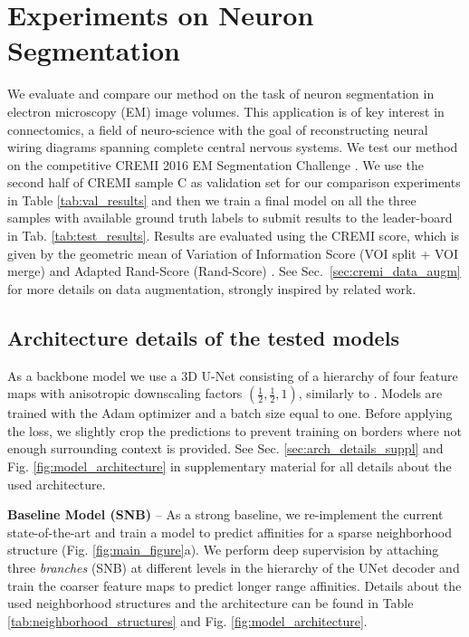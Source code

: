 

\section{Experiments on Neuron Segmentation}
We evaluate and compare our method on the task of neuron segmentation in electron microscopy (EM) image volumes. This application is of key interest in connectomics, a field of neuro-science with the goal of reconstructing neural wiring diagrams spanning complete central nervous systems. 
We test our method on the competitive CREMI 2016 EM Segmentation Challenge \cite{cremiChallenge}. 
We use the second half of CREMI sample C as validation set for our comparison experiments in Table \ref{tab:val_results} and then we train a final model on all the three samples with available ground truth labels to submit results to the leader-board in Tab. \ref{tab:test_results}. 
Results  are evaluated using the CREMI score, which is given by the geometric mean of Variation of Information Score (VOI split + VOI merge) and Adapted Rand-Score (Rand-Score) \cite{arganda2015crowdsourcing}. See Sec.~\ref{sec:cremi_data_augm} for more details on data augmentation, strongly inspired by related work.


\subsection{Architecture details of the tested models}\label{sec:models_details}
As a backbone model we use a 3D U-Net consisting of a hierarchy of four feature maps with anisotropic downscaling factors $(\frac{1}{2},\frac{1}{2},1)$, similarly to \cite{lee2019learning,lee2017superhuman,wolf2018mutex}. 
Models are trained with the Adam optimizer and a batch size equal to one. Before applying the loss, we slightly crop the predictions to prevent training on borders where not enough surrounding context is provided. 
See Sec. \ref{sec:arch_details_suppl} and Fig. \ref{fig:model_architecture} in supplementary material for all details about the used architecture. 

 
\textbf{Baseline Model (SNB)} -- As a strong baseline, we re-implement the current state-of-the-art and train a model to predict affinities for a sparse neighborhood structure (Fig. \ref{fig:main_figure}a). We perform deep supervision by attaching three \emph{\sparseBr branches} (SNB) at different levels in the hierarchy of the UNet decoder and train the coarser feature maps to predict longer range affinities. Details about the used neighborhood structures and the architecture can be found in Table \ref{tab:neighborhood_structures} and Fig. \ref{fig:model_architecture}.

